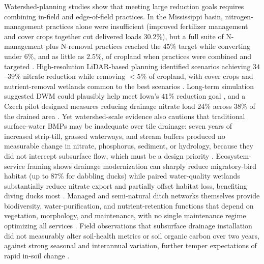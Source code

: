 \documentclass[11pt]{article}
\begin{document}
Watershed-planning studies show that meeting large reduction goals requires
combining in-field and edge-of-field practices. In the Mississippi basin,
nitrogen-management practices alone were insufficient (improved fertilizer
management and cover crops together cut delivered loads $30.2\%$), but a
full suite of N-management plus N-removal practices reached the $45\%$
target while converting under $6\%$, and as little as $2.5\%$, of cropland
when practices were combined and targeted \parencite{McLellan2015}.
High-resolution LiDAR-based planning identified scenarios achieving
$34$--$39\%$ nitrate reduction while removing $<5\%$ of cropland, with cover
crops and nutrient-removal wetlands common to the best scenarios
\parencite{Tomer2015}. Long-term simulation suggested DWM could plausibly
help meet Iowa's $41\%$ reduction goal \parencite{Craft2018}, and a Czech
pilot designed measures reducing drainage nitrate load $24\%$ across $38\%$
of the drained area \parencite{Kvítek2023}. Yet watershed-scale evidence
also cautions that traditional surface-water BMPs may be inadequate over
tile drainage: seven years of increased strip-till, grassed waterways, and
stream buffers produced no measurable change in nitrate, phosphorus,
sediment, or hydrology, because they did not intercept subsurface flow,
which must be a design priority \parencite{Lemke2011}. Ecosystem-service
framing shows drainage modernization can sharply reduce migratory-bird
habitat (up to $87\%$ for dabbling ducks) while paired water-quality
wetlands substantially reduce nitrate export and partially offset habitat
loss, benefiting diving ducks most \parencite{Mitchell2022,Mitchell2025}.
Managed and semi-natural ditch networks themselves provide biodiversity,
water-purification, and nutrient-retention functions that depend on
vegetation, morphology, and maintenance, with no single maintenance regime
optimizing all services \parencite{Dollinger2015,Herzon2008}. Field
observations that subsurface drainage installation did not measurably alter
soil-health metrics or soil organic carbon over two years, against strong
seasonal and interannual variation, further temper expectations of rapid
in-soil change \parencite{Sherbine2023,Huang2023}.

\printbibliography
\end{document}

